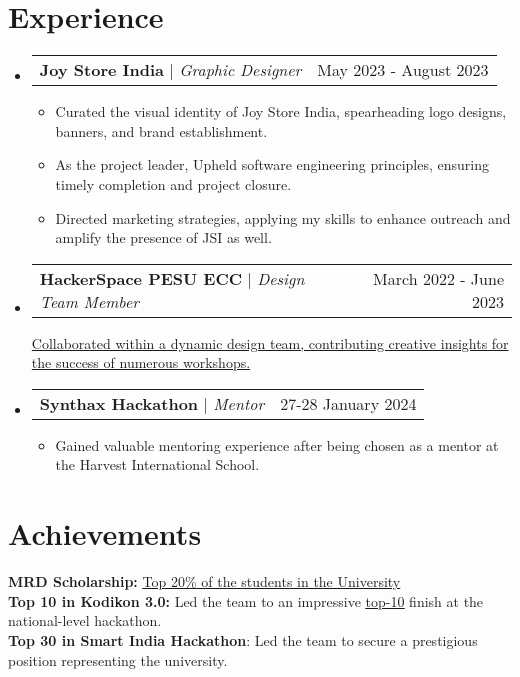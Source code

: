 \documentclass[letterpaper,11pt]{article}
\makeatletter
\newcommand{\resumeItem}[1]{
  \item\small{
    {#1 \vspace{-2pt}}
  }
}
\newcommand{\resumeProjectHeading}[2]{
    \item
    \begin{tabular*}{0.97\textwidth}{l@{\extracolsep{\fill}}r}
      \small#1 & #2 \\
    \end{tabular*}\vspace{-7pt}
}
\newcommand{\resumeSubHeadingListStart}{\begin{itemize}[leftmargin=0.15in, label={}]}
\newcommand{\resumeSubHeadingListEnd}{\end{itemize}}
\newcommand{\resumeItemListStart}{\begin{itemize}}
\newcommand{\resumeItemListEnd}{\end{itemize}\vspace{-5pt}}
\makeatother
\begin{document}
\section{Experience}
  \resumeSubHeadingListStart
        \resumeProjectHeading
          {\textbf{Joy Store India} $|$ \footnotesize\emph{Graphic Designer}\vspace{3pt}}{May 2023 - August 2023}
          \resumeItemListStart
            \resumeItem{Curated the visual identity of Joy Store India, spearheading logo designs, banners, and brand establishment.}
            \resumeItem{As the project leader, Upheld software engineering principles, ensuring timely completion and project closure.}
            \resumeItem{Directed marketing strategies, applying my skills to enhance outreach and amplify the presence of JSI as well.}
        \resumeItemListEnd
        \resumeProjectHeading
          {\textbf{HackerSpace PESU ECC} $|$ \footnotesize\emph{Design Team Member}\vspace{8pt}}{March 2022 - June 2023}
          \href{https://www.instagram.com/p/CbHnbkPAqs2/?igshid=MzRlODBiNWFlZA%3D%3D&img_index=1}{\small{Collaborated within a dynamic design team, contributing creative insights for the success of numerous workshops.}}
       \resumeProjectHeading
          {\textbf{Synthax Hackathon} $|$ \footnotesize\emph{Mentor}}{27-28 January 2024}
            \resumeItemListStart
                \resumeItem{Gained valuable mentoring experience after being chosen as a mentor at the Harvest International School.}
            \resumeItemListEnd
   \resumeSubHeadingListEnd 

\section{Achievements}
\begin{itemize}[leftmargin=0.15in, label={}]
    \small{\item{
    
     \textbf{MRD Scholarship: }\href{https://drive.google.com/file/d/165MKp1oXSgvJpZoC17rnhxoq5BZP28Va/view?usp=sharing}{\underline{\faTrophy{}  Top 20\%}{ of the students in the University}} \\
    

     \textbf{Top 10 in Kodikon 3.0: }{Led the team to an impressive }\href{https://drive.google.com/file/d/1zE2c2vQAUzSWOnhfeUJ2MOQWz7Egtn11/view?usp=sharing}{\underline{top-10}}{ finish at the national-level hackathon.} \\

     \textbf{Top 30 in Smart India Hackathon}{: Led the team to secure a prestigious position representing the university.} \\ 
    }}
 \end{itemize}
\end{document}
